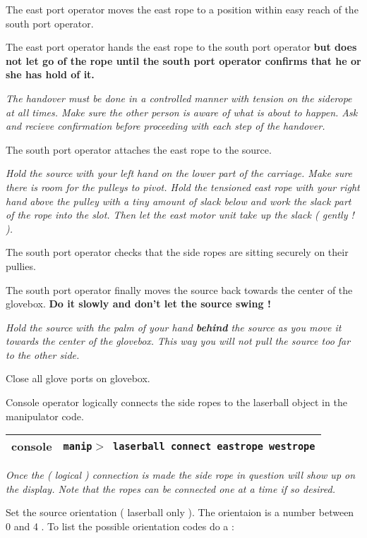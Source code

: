 \begin{enumerate}
\checkitem The east port operator
  moves the east rope to a position within easy reach of the south port
 operator.

\checkitem The east port operator hands the east rope to the south port
operator {\bf but does not let go of the rope until the south port operator confirms
that he or she has hold of it.}

\small
{\em The handover must be done in a controlled manner with tension on the siderope at
all times. Make sure the other person
is aware of what is about to happen. Ask and recieve confirmation before proceeding
with each step of the handover. }
\normalsize


\checkitem The south port operator attaches the east rope to the source.

\small
{\em Hold the source with your left hand on  the lower part of the
carriage. Make sure there is room for the pulleys to pivot. Hold the tensioned east
rope with your right hand above the pulley with a tiny amount of slack below and work
the slack part of the rope into the slot. Then let the east motor unit take up
the slack ( gently ! ). 
}
\normalsize

  
\checkitem The south port operator checks that the side ropes are sitting
  securely on their pullies.
  
\checkitem The south port operator finally moves the source back towards
the center of the glovebox. {\bf Do it slowly and don't let the source swing !}

\small
{\em Hold the source with the palm of your hand {\bf behind} the source as you
move it towards the center of the glovebox. This way you will not pull the source
too far to the other side.
}
\normalsize

\checkitem Close all glove ports on glovebox.
  
\checkitem Console operator logically connects the side ropes to the laserball object
  in the manipulator code.
  \begin{center}
  \begin{tabular}{|l|l|}
  \hline
  console & {\tt manip$>$ laserball connect eastrope westrope} \\
  \hline
  \end{tabular}
  \end{center}
\small
{\em Once the ( logical ) connection is made the side rope in question will
show up on the display.
  Note that the ropes can be connected one at a time if so desired.

}
\normalsize
\checkitem Set the source orientation ( laserball only ). The orientaion is
a number between 0 and 4 . To list the possible orientation codes do a :


\end{enumerate}
